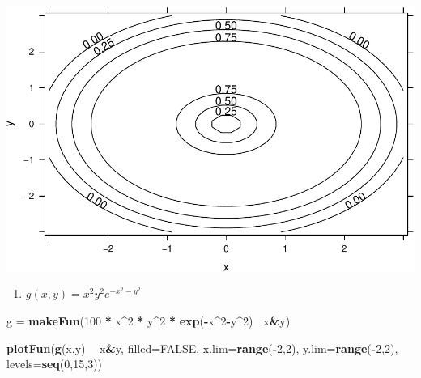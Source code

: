 \documentclass[
]{book}
\newenvironment{Shaded}{\begin{snugshade}}{\end{snugshade}}
\newcommand{\DataTypeTok}[1]{\textcolor[rgb]{0.13,0.29,0.53}{#1}}
\newcommand{\DecValTok}[1]{\textcolor[rgb]{0.00,0.00,0.81}{#1}}
\newcommand{\KeywordTok}[1]{\textcolor[rgb]{0.13,0.29,0.53}{\textbf{#1}}}
\newcommand{\NormalTok}[1]{#1}
\newcommand{\OperatorTok}[1]{\textcolor[rgb]{0.81,0.36,0.00}{\textbf{#1}}}
\newcommand{\OtherTok}[1]{\textcolor[rgb]{0.56,0.35,0.01}{#1}}
\newcommand{\StringTok}[1]{\textcolor[rgb]{0.31,0.60,0.02}{#1}}
\providecommand{\tightlist}{%
  \setlength{\itemsep}{0pt}\setlength{\parskip}{0pt}}
\begin{document}
\includegraphics{_bookdown_files/math135_handbook_files/figure-latex/unnamed-chunk-81-1.pdf}

\begin{enumerate}
\def\labelenumi{\arabic{enumi}.}
\setcounter{enumi}{1}
\tightlist
\item
  \(g(x,y) = x^2 y^2 e^{-x^2-y^2}\)
\end{enumerate}

\begin{Shaded}
\begin{Highlighting}[]
\NormalTok{g =}\StringTok{ }\KeywordTok{makeFun}\NormalTok{(}\DecValTok{100} \OperatorTok{*}\StringTok{ }\NormalTok{x}\OperatorTok{^}\DecValTok{2} \OperatorTok{*}\StringTok{  }\NormalTok{y}\OperatorTok{^}\DecValTok{2} \OperatorTok{*}\StringTok{ }\KeywordTok{exp}\NormalTok{(}\OperatorTok{-}\NormalTok{x}\OperatorTok{^}\DecValTok{2}\OperatorTok{-}\NormalTok{y}\OperatorTok{^}\DecValTok{2}\NormalTok{)}\OperatorTok{~}\StringTok{ }\NormalTok{x}\OperatorTok{&}\NormalTok{y)}

\KeywordTok{plotFun}\NormalTok{(}\KeywordTok{g}\NormalTok{(x,y) }\OperatorTok{~}\StringTok{ }\NormalTok{x}\OperatorTok{&}\NormalTok{y, }\DataTypeTok{filled=}\OtherTok{FALSE}\NormalTok{, }\DataTypeTok{x.lim=}\KeywordTok{range}\NormalTok{(}\OperatorTok{-}\DecValTok{2}\NormalTok{,}\DecValTok{2}\NormalTok{), }\DataTypeTok{y.lim=}\KeywordTok{range}\NormalTok{(}\OperatorTok{-}\DecValTok{2}\NormalTok{,}\DecValTok{2}\NormalTok{), }\DataTypeTok{levels=}\KeywordTok{seq}\NormalTok{(}\DecValTok{0}\NormalTok{,}\DecValTok{15}\NormalTok{,}\DecValTok{3}\NormalTok{))}
\end{Highlighting}
\end{Shaded}
\end{document}
